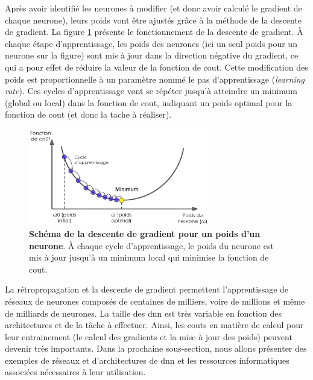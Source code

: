 Après avoir identifié les neurones à modifier (et donc avoir calculé le gradient de chaque neurone), leurs poids vont être ajustés grâce à la méthode de la descente de gradient. La figure \ref{fig:grad_descent} présente le fonctionnement de la descente de gradient. À chaque étape d'apprentissage, les poids des neurones (ici un seul poids pour un neurone sur la figure) sont mis à jour dans la direction négative du gradient, ce qui a pour effet de réduire la valeur de la fonction de cout. Cette modification des poids  est proportionnelle à un paramètre nommé le pas d'apprentissage (\textit{learning rate}). Ces cycles d'apprentissage vont se répéter jusqu'à atteindre un minimum (global ou local) dans la fonction de cout, indiquant un poids optimal pour la fonction de cout (et donc la tache à réaliser).
\begin{figure}[!ht]
 \centering
 \includegraphics[width=0.7\textwidth]{figures/gradient_descent.png}
 \caption[Schéma de la descente de gradient pour un poids d'un neurone]{\textbf{Schéma de la descente de gradient pour un poids d'un neurone}. À chaque cycle d'apprentissage, le poids du neurone est mis à jour jusqu'à un minimum local qui minimise la fonction de cout.}
 \label{fig:grad_descent}
\end{figure}


La rétropropagation et la descente de gradient permettent l'apprentissage de réseaux de neurones composés de centaines de milliers, voire de millions et même de milliards de neurones. La taille des \gls{dnn} est très variable en fonction des architectures et de la tâche à effectuer. Ainsi, les couts en matière de calcul pour leur entrainement (le calcul des gradients et la mise à jour des poids) peuvent devenir très importants. Dans la prochaine sous-section, nous allons présenter des exemples de réseaux et d'architectures de \gls{dnn} et les ressources informatiques associées nécessaires à leur utilisation.

